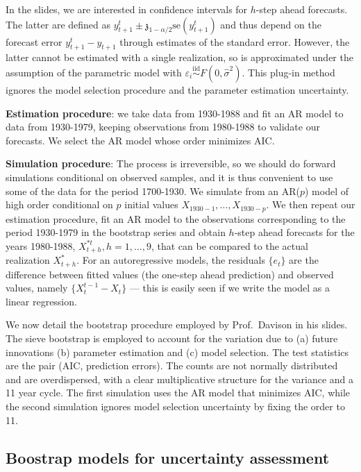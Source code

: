 \documentclass[]{book}
\begin{document}
In the slides, we are interested in confidence intervals for \(h\)-step ahead forecasts. The latter are defined as \({y}_{t+1}^t\pm \mathfrak{z}_{1-\alpha/2}\mathrm{se}({y}_{t+1}^t)\) and thus depend on the forecast error \(y_{t+1}^t-y_{t+1}\) through estimates of the standard error. However, the latter cannot be estimated with a single realization, so is approximated under the assumption of the parametric model with \(\varepsilon_i \stackrel{\mathrm{iid}}{\sim}F(0,\widehat{\sigma}^2)\). This plug-in method ignores the model selection procedure and the parameter estimation uncertainty.

\textbf{Estimation procedure}: we take data from 1930-1988 and fit an AR model to data from 1930-1979, keeping observations from 1980-1988 to validate our forecasts. We select the AR model whose order minimizes AIC.

\textbf{Simulation procedure}: The process is irreversible, so we should do forward simulations conditional on observed samples, and it is thus convenient to use some of the data for the period 1700-1930. We simulate from an AR(\(p\)) model of high order conditional on \(p\) initial values \(X_{1930-1}, \ldots, X_{1930-p}\). We then repeat our estimation procedure, fit an AR model to the observations corresponding to the period 1930-1979 in the bootstrap series and obtain \(h\)-step ahead forecasts for the years 1980-1988, \(X_{t+h}^{*t}, h=1, \ldots, 9\), that can be compared to the actual realization \(X^{*}_{t+h}\). For an autoregressive models, the residuals \(\{e_{t}\}\) are the difference between fitted values (the one-step ahead prediction) and observed values, namely \(\{X_{t}^{t-1}-X_{t}\}\) --- this is easily seen if we write the model as a linear regression.

We now detail the bootstrap procedure employed by Prof.~Davison in his slides. The sieve bootstrap is employed to account for the variation due to (a) future innovations (b) parameter estimation and (c) model selection. The test statistics are the pair (AIC, prediction errors). The counts are not normally distributed and are overdispersed, with a clear multiplicative structure for the variance and a 11 year cycle. The first simulation uses the AR model that minimizes AIC, while the second simulation ignores model selection uncertainty by fixing the order to 11.

\hypertarget{boostrap-models-for-uncertainty-assessment}{%
\subsection{Boostrap models for uncertainty assessment}\label{boostrap-models-for-uncertainty-assessment}}
\end{document}
